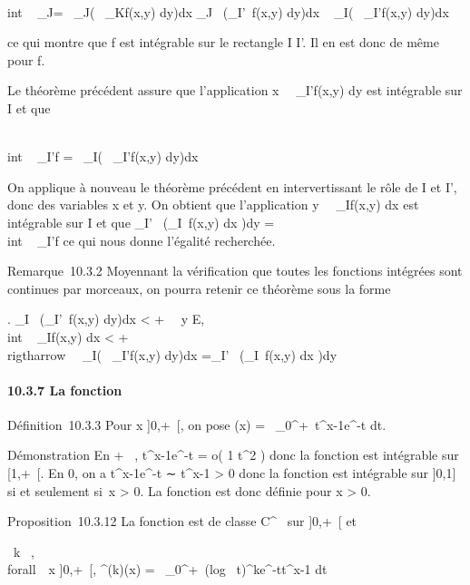 \documentclass[]{article}
\begin{document}
\int  \\int ~
_J\timesKf =\int ~
_J\left (\int ~
_Kf(x,y) dy\right )dx
\leq\int  _J~\left
(\int  _I'~f(x,y)
dy\right )dx \leq\int ~
_I\left (\int ~
_I'f(x,y) dy\right )dx

ce qui montre que f est intégrable sur le rectangle
I \times I'. Il en est donc de même pour f.

Le théorème précédent assure que l'application
x\mapsto~\int ~
_I'f(x,y) dy est intégrable sur I et que

\int  \\int ~
_I\timesI'f =\int ~
_I\left (\int ~
_I'f(x,y) dy\right )dx

On applique à nouveau le théorème précédent en intervertissant le rôle
de I et I', donc des variables x et y. On obtient que l'application
y\mapsto~\int ~
_If(x,y) dx est intégrable sur I et que
\int  _I'~\left
(\int  _I~f(x,y) dx\right
)dy =\int  \\int ~
_I\timesI'f ce qui nous donne l'égalité recherchée.

Remarque~10.3.2 Moyennant la vérification que toutes les fonctions
intégrées sont continues par morceaux, on pourra retenir ce théorème
sous la forme

\left .\array
\int  _I~\left
(\int  _I'~f(x,y)
dy\right )dx < +\infty~ \cr
\forall~y \in E, \\int ~
_If(x,y) dx < +\infty~ 
\right \\rigtharrow~\int ~
_I\left (\int ~
_I'f(x,y) dy\right )dx
=\int  _I'~\left
(\int  _I~f(x,y) dx\right
)dy

\paragraph{10.3.7 La fonction \Gamma}

Définition~10.3.3 Pour x \in]0,+\infty~[, on pose \Gamma(x)
=\int ~
_0^+\infty~t^x-1e^-t dt.

Démonstration En + \infty~, t^x-1e^-t = o( 1
\over t^2 ) donc la fonction est intégrable
sur [1,+\infty~[. En 0, on a t^x-1e^-t ∼
t^x-1 > 0 donc la fonction est intégrable sur
]0,1] si et seulement si~x > 0. La fonction \Gamma est donc
définie pour x > 0.

Proposition~10.3.12 La fonction \Gamma est de classe C^\infty~ sur
]0,+\infty~[ et

\forall~k \in {}~, \\forall~~x
\in]0,+\infty~[, \Gamma^(k)(x) =\int ~
_0^+\infty~(log~
t)^ke^-tt^x-1 dt
\end{document}
